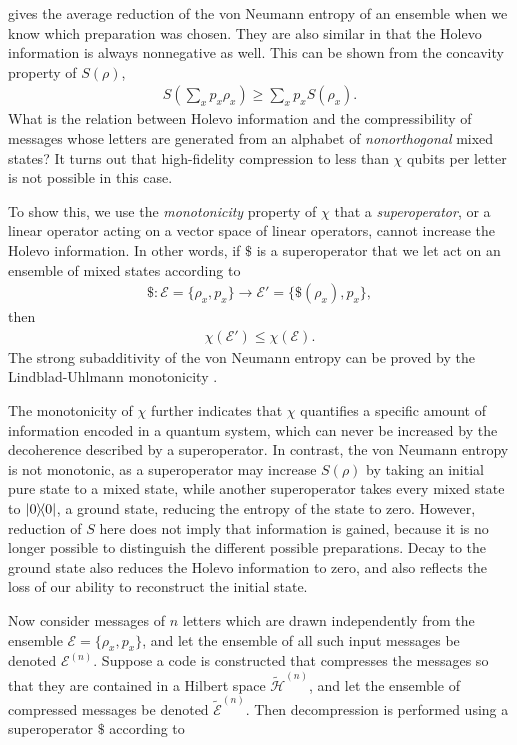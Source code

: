 \documentclass[a4paper, 12pt]{article}
\numberwithin{equation}{section}
\numberwithin{figure}{section}
\theoremstyle{definition}
\begin{document}
    gives the average reduction of the von Neumann entropy of an ensemble when we know which preparation was chosen. They are also similar in that the Holevo information is always nonnegative as well. This can be shown from the concavity property of $S(\rho)$,
    \begin{align}
        S \left( \sum_x p_x \rho_x \right) \geq \sum_x p_x S(\rho_x).
    \end{align}
    What is the relation between Holevo information and the compressibility of messages whose letters are generated from an alphabet of \textit{nonorthogonal} mixed states? It turns out that high-fidelity compression to less than $\chi$ qubits per letter is not possible in this case. \par
    To show this, we use the \textit{monotonicity} property of $\chi$ that a \textit{superoperator}, or a linear operator acting on a vector space of linear operators, cannot increase the Holevo information. In other words, if $\$$ is a superoperator that we let act on an ensemble of mixed states according to
    \begin{align}
        \$ : \mathcal{E} = \{ \rho_x, p_x \} \to \mathcal{E}' = \{ \$(\rho_x), p_x \},
    \end{align}
    then
    \begin{align}
        \chi(\mathcal{E}') \leq \chi(\mathcal{E}).
    \end{align}
    The strong subadditivity of the von Neumann entropy can be proved by the Lindblad-Uhlmann monotonicity \cite{preskill}. \par
    The monotonicity of $\chi$ further indicates that $\chi$ quantifies a specific amount of information encoded in a quantum system, which can never be increased by the decoherence described by a superoperator. In contrast, the von Neumann entropy is not monotonic, as a superoperator may increase $S(\rho)$ by taking an initial pure state to a mixed state, while another superoperator takes every mixed state to $\dyad{0}{0}$, a ground state, reducing the entropy of the state to zero. However, reduction of $S$ here does not imply that information is gained, because it is no longer possible to distinguish the different possible preparations. Decay to the ground state also reduces the Holevo information to zero, and also reflects the loss of our ability to reconstruct the initial state. \par
    Now consider messages of $n$ letters which are drawn independently from the ensemble $\mathcal{E} = \{ \rho_x, p_x \}$, and let the ensemble of all such input messages be denoted $\mathcal{E}^{(n)}$. Suppose a code is constructed that compresses the messages so that they are contained in a Hilbert space $\tilde{\mathcal{H}}^{(n)}$, and let the ensemble of compressed messages be denoted $\tilde{\mathcal{E}}^{(n)}$. Then decompression is performed using a superoperator $\$$ according to
\end{document}
